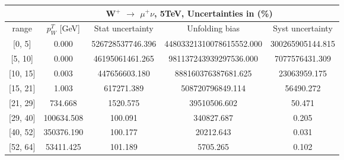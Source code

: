 \documentclass[12pt]{article}
\begin{document}
 
\begin{table}[] 
\begin{tabular}{c|c|c|c|c|}
\cline{2-5}
& \multicolumn{4}{c|}{W$^{+}$ $\rightarrow$ $\mu ^{+} \nu $, 5TeV, Uncertainties in (\%)}  \\ \hline \hline 
\multicolumn{1}{|c|}{  range } & $p^{T}_{W}$ [GeV]     & Stat uncertainty     & Unfolding bias     & Syst uncertainty        \\ \hline \hline 
\multicolumn{1}{|c|}{{[}0,  5{]}}  & 0.000 & 526728537746.396 & 44803321310078615552.000 & 300265905144.815 \\ \hline 
\multicolumn{1}{|c|}{{[}5,  10{]}}  & 0.000 & 46195061461.265 & 981137243939297536.000 & 7077576431.309 \\ \hline 
\multicolumn{1}{|c|}{{[}10,  15{]}}  & 0.003 & 447656603.180 & 888160376387681.625 & 23063959.175 \\ \hline 
\multicolumn{1}{|c|}{{[}15,  21{]}}  & 1.003 & 617271.389 & 508720796849.114 & 56490.272 \\ \hline 
\multicolumn{1}{|c|}{{[}21,  29{]}}  & 734.668 & 1520.575 & 39510506.602 & 50.471 \\ \hline 
\multicolumn{1}{|c|}{{[}29,  40{]}}  & 100634.508 & 100.091 & 340827.687 & 0.205 \\ \hline 
\multicolumn{1}{|c|}{{[}40,  52{]}}  & 350376.190 & 100.177 & 20212.643 & 0.031 \\ \hline 
\multicolumn{1}{|c|}{{[}52,  64{]}}  & 53411.425 & 101.189 & 5705.265 & 0.102 \\ \hline 
\end{tabular}
\end{table}
\end{document}
